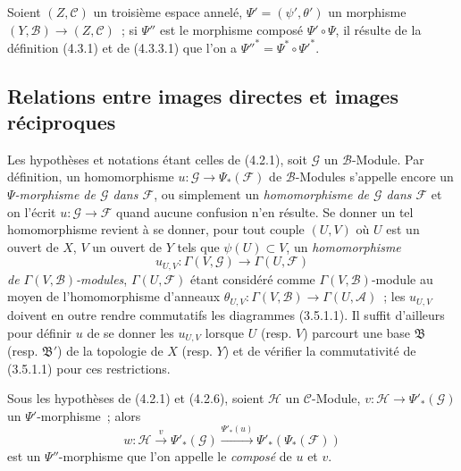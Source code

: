 \begin{env}[4.3.6]
\label{0.4.3.6-fr}
Soient $(Z,\mathcal{C})$ un troisième espace annelé,
$\Psi'=(\psi',\theta')$ un morphisme $(Y,\mathcal{B})\to(Z,\mathcal{C})$~;
si $\Psi''$ est le morphisme composé $\Psi'\circ\Psi$, il résulte de la
définition (4.3.1) et de (4.3.3.1) que l'on a
${\Psi''}^*=\Psi^*\circ{\Psi'}^*$.
\end{env}

\subsection{Relations entre images directes et images réciproques}
\label{subsection:0.4.4-fr}

\begin{env}[4.4.1]
\label{0.4.4.1-fr}
Les hypothèses et notations étant celles de (4.2.1), soit $\mathcal{G}$ un
$\mathcal{B}$-Module. Par définition, un homomorphisme
$u:\mathcal{G}\to\Psi_*(\mathcal{F})$ de $\mathcal{B}$-Modules s'appelle
encore un \emph{$\Psi$-morphisme de $\mathcal{G}$ dans $\mathcal{F}$}, ou
simplement un \emph{homomorphisme de $\mathcal{G}$ dans $\mathcal{F}$} et on
l'écrit $u:\mathcal{G}\to\mathcal{F}$ quand aucune confusion n'en résulte.
Se donner un tel homomorphisme revient à se donner, pour tout couple $(U,V)$
où $U$ est un ouvert de $X$, $V$ un ouvert de $Y$ tels que
$\psi(U)\subset V$, un \emph{homomorphisme}
\[
  u_{U,V}:\Gamma(V,\mathcal{G})\longrightarrow\Gamma(U,\mathcal{F})
\]
\emph{de $\Gamma(V,\mathcal{B})$-modules}, $\Gamma(U,\mathcal{F})$ étant
considéré comme $\Gamma(V,\mathcal{B})$-module au moyen de l'homomorphisme
d'anneaux
$\theta_{U,V}:\Gamma(V,\mathcal{B})\to\Gamma(U,\mathcal{A})$~; les $u_{U,V}$
doivent en outre rendre commutatifs les diagrammes (3.5.1.1). Il suffit
d'ailleurs pour définir $u$ de se donner les $u_{U,V}$ lorsque $U$ (resp.
$V$) parcourt une base $\mathfrak{B}$ (resp. $\mathfrak{B}'$) de la topologie
de $X$ (resp. $Y$) et de vérifier la commutativité de (3.5.1.1) pour ces
restrictions.
\end{env}

\begin{env}[4.4.2]
\label{0.4.4.2-fr}
Sous les hypothèses de (4.2.1) et (4.2.6), soient $\mathcal{H}$ un
$\mathcal{C}$-Module, $v:\mathcal{H}\to\Psi'_*(\mathcal{G})$ un
$\Psi'$-morphisme~; alors
\[
  w:\mathcal{H}\xrightarrow{v}\Psi'_*(\mathcal{G})
  \xrightarrow{\Psi'_*(u)}\Psi'_*(\Psi_*(\mathcal{F}))
\]
est un $\Psi''$-morphisme que l'on appelle le \emph{composé} de $u$ et $v$.
\end{env}

